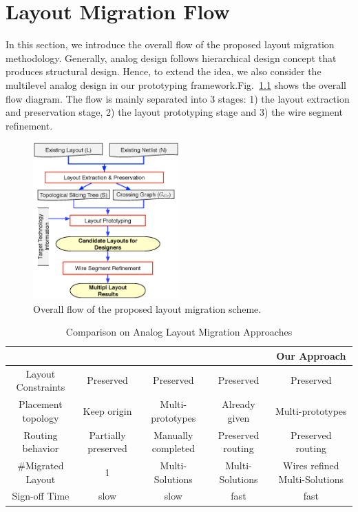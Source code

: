 \chapter{Layout Migration Flow}\label{chap:migration}

  In this section, we introduce the overall flow of the proposed layout migration methodology.
  Generally, analog design follows hierarchical design concept that produces structural design. 
  Hence, to extend the idea, we also consider the multilevel analog design in our prototyping framework.Fig.~\ref{fig:Flow} shows the overall flow diagram.
  The flow is mainly separated into 3 stages: 1) the layout extraction and preservation stage, 2) the layout prototyping stage and 3) the wire segment refinement. 
  
  
  \begin{figure}[ht]
  \centering
  \includegraphics[width=0.5\textwidth]{Fig/Flow.eps}
  \caption{Overall flow of the proposed layout migration scheme.} 
  \label{fig:Flow}
  \end{figure}

  \begin{table}
    \begin{center}
    \caption{Comparison on Analog Layout Migration Approaches}\label{table:MigrateComp}
    \scriptsize
    \begin{tabular}{|c|c|c|c|c|}
      \hline
      & \cite{msc-bhattacharya-tcad06} & \cite{ALP_YPWeng_iccad2011} & \cite{Chin_DMR_ICCAD2013} & Our Approach \\
      \hline
      Layout Constraints & Preserved & Preserved & Preserved & Preserved \\
      \hline
      Placement topology  & Keep origin & Multi-prototypes & Already given & Multi-prototypes \\
      \hline  
      Routing behavior  & Partially preserved &  Manually completed &  Preserved routing & Preserved routing \\
      \hline
      \#Migrated Layout &  1 &  Multi-Solutions & Multi-Solutions & Wires refined Multi-Solutions \\
      \hline
      Sign-off Time &   slow &  slow &  fast &  fast \\
      \hline
    \end{tabular}
    \end{center}
  \end{table}

